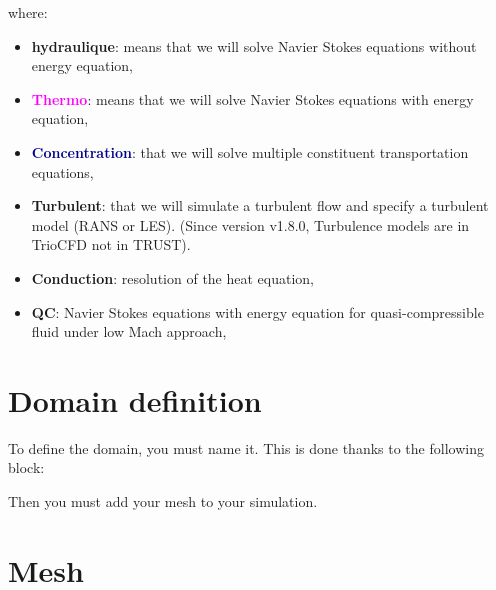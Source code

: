 where:
\begin{itemize}
\item \textbf{hydraulique}: means that we will solve Navier Stokes equations without energy equation,
\item \textbf{\textcolor{magenta}{Thermo}}: means that we will solve Navier Stokes equations with energy equation,
\item \textbf{\textcolor{darkblue}{Concentration}}: that we will solve multiple constituent transportation equations,
\item \textbf{\textcolor{Greeen}{Turbulent}}: that we will simulate a turbulent flow and specify a turbulent model (RANS or LES). (Since version v1.8.0, \textcolor{Greeen}{Turbulence} models are in TrioCFD not in TRUST).
\item \textbf{Conduction}: resolution of the heat equation,
\item \textbf{QC}: Navier Stokes equations with energy equation for quasi-compressible fluid under low Mach approach,
\end{itemize}





\section{Domain definition}
To define the domain, you must name it. This is done thanks to the following block:

    \begin{center}
    \end{center}

Then you must add your mesh to your simulation.




\section{Mesh} \label{Mesh}

